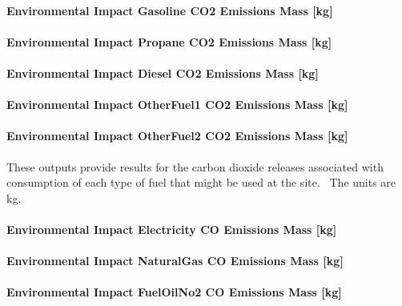 \paragraph{Environmental Impact Gasoline CO2 Emissions Mass {[}kg{]}}\label{environmental-impact-gasoline-co2-emissions-mass-kg}

\paragraph{Environmental Impact Propane CO2 Emissions Mass {[}kg{]}}\label{environmental-impact-propane-co2-emissions-mass-kg}

\paragraph{Environmental Impact Diesel CO2 Emissions Mass {[}kg{]}}\label{environmental-impact-diesel-co2-emissions-mass-kg}

\paragraph{Environmental Impact OtherFuel1 CO2 Emissions Mass {[}kg{]}}\label{environmental-impact-otherfuel1-co2-emissions-mass-kg}

\paragraph{Environmental Impact OtherFuel2 CO2 Emissions Mass {[}kg{]}}\label{environmental-impact-otherfuel2-co2-emissions-mass-kg}

These outputs provide results for the carbon dioxide releases associated with consumption of each type of fuel that might be used at the site.~ The units are kg.

\paragraph{Environmental Impact Electricity CO Emissions Mass {[}kg{]}}\label{environmental-impact-electricity-co-emissions-mass-kg}

\paragraph{Environmental Impact NaturalGas CO Emissions Mass {[}kg{]}}\label{environmental-impact-natural-gas-co-emissions-mass-kg}

\paragraph{Environmental Impact FuelOilNo2 CO Emissions Mass {[}kg{]}}\label{environmental-impact-fuel-oil-2-co-emissions-mass-kg}

